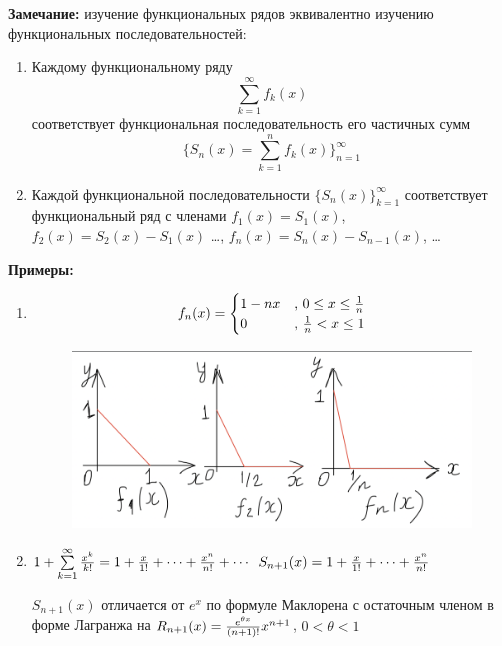 \documentclass[a4paper,12pt]{article} %
\begin{document}
\textbf{Замечание:} изучение функциональных рядов эквивалентно изучению функциональных последовательностей:\newline
\begin{enumerate}
    \item Каждому функциональному ряду $${\sum\limits_{k = 1}^{\infty}}f_k(x)$$ соответствует функциональная последовательность его частичных сумм $$\{S_n(x) = \sum\limits_{k = 1}^{n}f_k(x)\}_{n=1}^\infty$$ 
   \item Каждой функциональной последовательности $\{S_n(x)\}_{k=1}^\infty$ соответствует функциональный ряд с членами $f_1(x) = S_1(x)$, $f_2(x) = S_2(x) - S_1(x)$ \dots, $f_n(x) = S_n(x) - S_{n-1}(x)$, \dots 
   
\end{enumerate}

\noindent \textbf{Примеры:}
\begin{enumerate}
    
    \item 
\begin{equation*}
f_n(x) = 
 \begin{cases}
   1-nx &\text{, $0 \leq x \leq {1 \over n}$}\\
   0 &\text{, ${1\over n}< x\leq 1$}
 \end{cases}
\end{equation*}

\begin{figure}[h!]
    \centering
    \includegraphics[scale = 0.5]{10_bilet_primer1.png}
\end{figure}

    \item
    $1 + \sum\limits_{k=1}^\infty {x^k \over k!}  = 1 + {x\over 1!} + \cdots + {x^n \over n!} + \cdots$ \newline
    $S_{n+1}(x) = 1 + {x\over 1!} + \cdots + {x^n \over n!}$ \newline
    
    $S_{n+1}(x)$ отличается от $e^x$ по формуле Маклорена с остаточным членом в форме Лагранжа на $R_{n+1}(x)= {e^{\theta x}\over {(n+1)!}} x^{n+1}$,  $0 < \theta < 1$
\end{enumerate}
\end{document}
